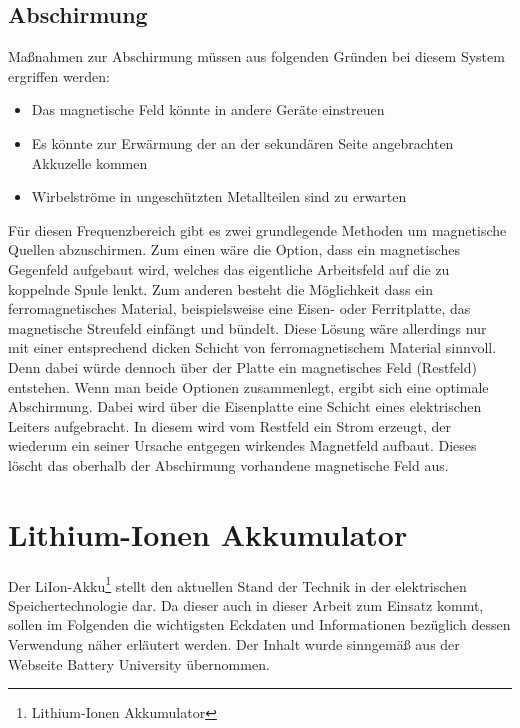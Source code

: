 \documentclass[12pt]{scrreprt} %
\begin{document}
\subsection{Abschirmung}
Maßnahmen zur Abschirmung müssen aus folgenden Gründen bei diesem System ergriffen werden:
\begin{itemize}
\item
Das magnetische Feld könnte in andere Geräte einstreuen
\item
Es könnte zur Erwärmung der an der sekundären Seite angebrachten Akkuzelle kommen
\item
Wirbelströme in ungeschützten Metallteilen sind zu erwarten
\end{itemize}
Für diesen Frequenzbereich gibt es zwei grundlegende Methoden um magnetische Quellen abzuschirmen. Zum einen wäre die Option, dass ein magnetisches Gegenfeld aufgebaut wird, welches das eigentliche Arbeitsfeld auf die zu koppelnde Spule lenkt. Zum anderen besteht die Möglichkeit dass ein ferromagnetisches Material, beispielsweise eine Eisen- oder Ferritplatte, das magnetische Streufeld einfängt und bündelt. Diese Lösung wäre allerdings nur mit einer entsprechend dicken Schicht von ferromagnetischem Material sinnvoll. Denn dabei würde dennoch über der Platte ein magnetisches Feld (Restfeld) entstehen. Wenn man beide Optionen zusammenlegt, ergibt sich eine optimale Abschirmung. Dabei wird über die Eisenplatte eine Schicht eines elektrischen Leiters aufgebracht. In diesem wird vom Restfeld ein Strom erzeugt, der wiederum ein seiner Ursache entgegen wirkendes Magnetfeld aufbaut. Dieses löscht das oberhalb der Abschirmung vorhandene magnetische Feld aus. 
\section{Lithium-Ionen Akkumulator}
Der LiIon-Akku\footnote{Lithium-Ionen Akkumulator} stellt den aktuellen Stand der Technik in der elektrischen Speichertechnologie dar. Da dieser auch in dieser Arbeit zum Einsatz kommt, sollen im Folgenden die wichtigsten Eckdaten und Informationen bezüglich dessen Verwendung näher erläutert werden. Der Inhalt wurde sinngemäß aus der Webseite Battery University \citep{BAT} übernommen.
\end{document}
